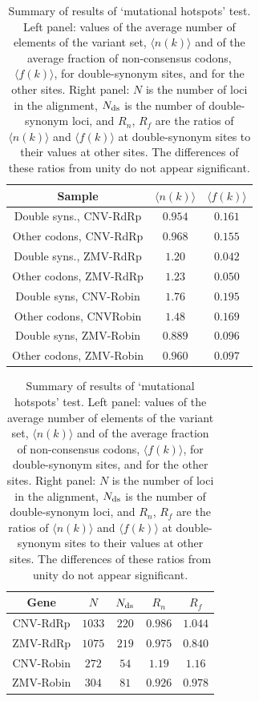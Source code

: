 \documentclass[unnumsec,webpdf,contemporary,large,namedate]{oup-authoring-template}%
\theoremstyle{thmstyleone}%
\theoremstyle{thmstyletwo}%
\theoremstyle{thmstylethree}%
\begin{document}
\begin{table}[h]
\begin{minipage}{0.5\textwidth}
\centering
\begin{tabular}{|c|c|c|}
\hline
Sample&$\langle n(k)\rangle$&$\langle f(k)\rangle$\\ 
\hline
Double syns., CNV-RdRp  &$0.954$&$0.161$\\ 
Other codons, CNV-RdRp  &$0.968$&$0.155$\\
Double syns., ZMV-RdRp  &$1.20$&$0.042$\\ 
Other codons, ZMV-RdRp  &$1.23$&$0.050$\\
Double syns, CNV-Robin &$1.76$&$0.195$\\
Other codons, CNVRobin &$1.48$&$0.169$\\
Double syns, ZMV-Robin   &$0.889$&$0.096$\\
Other codons, ZMV-Robin &$0.960$&$0.097$\\
\hline
\end{tabular}
\end{minipage}
\begin{minipage}{0.4\textwidth}
\centering
\begin{tabular}{|c|c|c|c|c|}
\hline
Gene&$N$&$N_{\rm ds}$&$R_n$&$R_f$\\ 
\hline
CNV-RdRp  &$1033$&$220$&$0.986$&$1.044$\\
ZMV-RdRp  &$1075$&$219$&$0.975$&$0.840$\\
CNV-Robin  &$272$&$54$&$1.19$&$1.16$\\ 
ZMV-Robin  &$304$&$81$&$0.926$&$0.978$\\ 
\hline
\end{tabular}
\end{minipage}
\caption{Summary of results of \lq mutational hotspots' test. Left panel: values of the average number 
of elements of the variant set, $\langle n(k)\rangle$ and of the average fraction of non-consensus 
codons, $\langle f(k)\rangle$, for double-synonym sites,  and for the other sites.
Right panel: $N$ is the number of loci in the alignment, $N_{\rm ds}$ is the 
number of double-synonym loci, and $R_n$, $R_f$ are the ratios of $\langle n(k)\rangle $
and $\langle f(k)\rangle$ at double-synonym sites to their values at other sites. 
The differences of these ratios from unity do not appear significant.
\label{tab: 5.4}}
\end{table}
\end{document}
